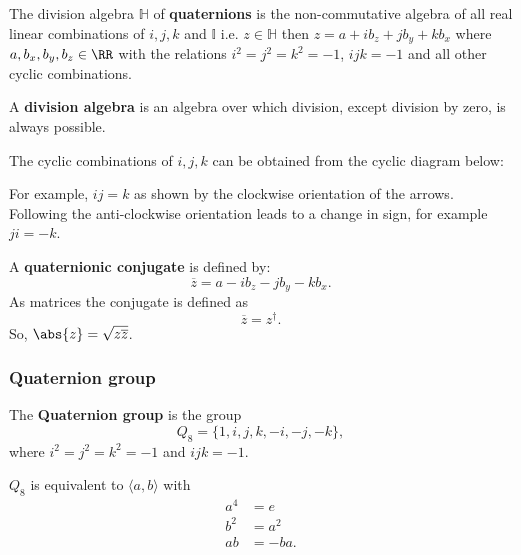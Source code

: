 \documentclass[12pt, a4paper]{article}
\begin{document}
\begin{definition}
    The division algebra \(\mathbb{H}\) of \textbf{quaternions} is the non-commutative algebra of all real linear combinations of \(i,j,k\) and \(\mathbb{I}\) i.e. \(z\in \mathbb{H}\) then \(z=a+ib_z+jb_y+kb_x\) where \(a,b_x,b_y,b_z \in \RR\) with the relations \(i^2=j^2=k^2 =-1\), \(ijk=-1\) and all other cyclic combinations.
\end{definition}

\begin{mdremark}
    A \textbf{division algebra} is an algebra over which division, except division by zero, is always possible.
\end{mdremark}

\begin{mdnote}
    The cyclic combinations of \(i,j,k\) can be obtained from the cyclic diagram below:
    \begin{center}
        
    \end{center}
    For example, \(ij =k\) as shown by the clockwise orientation of the arrows. Following the anti-clockwise orientation leads to a change in sign, for example \(ji=-k\).
\end{mdnote}

\begin{definition}
    A \textbf{quaternionic conjugate} is defined by:
    \[\overline{z}=a-ib_z-jb_y-kb_x.\]
    As matrices the conjugate is defined as
    \[\overline{z}=z^{\dagger}.\]
    So, \(\abs{z}=\sqrt{z\overline{z}}\).
\end{definition}

\subsubsection{Quaternion group}

\begin{definition}
    The \textbf{Quaternion group} is the group
    \[Q_8 = \{1,i,j,k,-i,-j,-k\},\]
    where \(i^2=j^2=k^2=-1\) and \(ijk=-1\).
\end{definition}

\begin{mdnote}
    \(Q_8\) is equivalent to \(\langle a,b \rangle\) with
    \[\begin{aligned}
        a^4&=e \\
        b^2 &= a^2 \\
        ab &= -ba.
    \end{aligned}\]
\end{mdnote}
\end{document}
